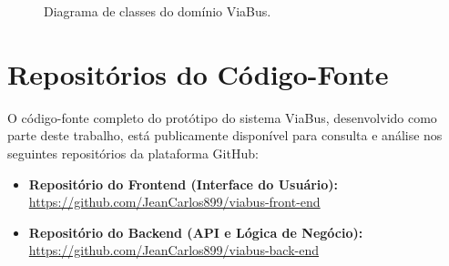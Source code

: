 \begin{apendicesenv}
\begin{figure}[H]
\begin{tikzpicture}[scale=0.6, every node/.style={transform shape}]
    \end{tikzpicture}
    \caption{Diagrama de classes do domínio ViaBus.}
    \label{fig:uml-dominio}
  \end{figure}

  \chapter{Repositórios do Código-Fonte}
  \label{apendice:repositorios}

  O código-fonte completo do protótipo do sistema ViaBus, desenvolvido como parte deste trabalho, está publicamente disponível para consulta e análise nos seguintes repositórios da plataforma GitHub:

  \vspace{1cm}

  \begin{itemize}
    \item \textbf{Repositório do Frontend (Interface do Usuário):} \\
          \url{https://github.com/JeanCarlos899/viabus-front-end}

    \item \textbf{Repositório do Backend (API e Lógica de Negócio):} \\
          \url{https://github.com/JeanCarlos899/viabus-back-end}
  \end{itemize}
\end{apendicesenv}